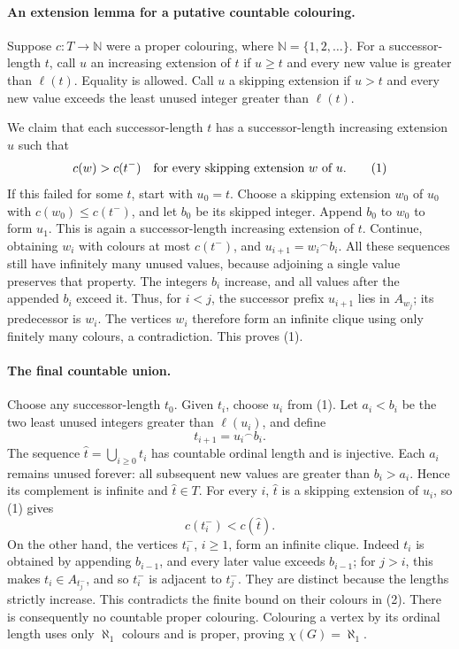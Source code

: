 \paragraph{An extension lemma for a putative countable colouring.}
Suppose \(c:T\to\mathbb N\) were a proper colouring, where \(\mathbb N=\{1,2,\ldots\}\).
For a successor-length \(t\), call \(u\) an increasing extension of \(t\) if \(u\geq t\) and every new value is greater than \(\ell(t)\). Equality is allowed. Call \(u\) a skipping extension if \(u>t\) and every new value exceeds the least unused integer greater than \(\ell(t)\).

We claim that each successor-length \(t\) has a successor-length increasing extension \(u\) such that
\[
 c(w)>c(t^-)
 \quad\hbox{for every skipping extension }w\hbox{ of }u.
 \tag{1}
\]
If this failed for some \(t\), start with \(u_0=t\). Choose a skipping extension \(w_0\) of \(u_0\) with \(c(w_0)\leq c(t^-)\), and let \(b_0\) be its skipped integer. Append \(b_0\) to \(w_0\) to form \(u_1\). This is again a successor-length increasing extension of \(t\). Continue, obtaining \(w_i\) with colours at most \(c(t^-)\), and \(u_{i+1}=w_i{}^\frown b_i\). All these sequences still have infinitely many unused values, because adjoining a single value preserves that property.
The integers \(b_i\) increase, and all values after the appended \(b_i\) exceed it. Thus, for \(i<j\), the successor prefix \(u_{i+1}\) lies in \(A_{w_j}\); its predecessor is \(w_i\). The vertices \(w_i\) therefore form an infinite clique using only finitely many colours, a contradiction. This proves (1).

\paragraph{The final countable union.}
Choose any successor-length \(t_0\). Given \(t_i\), choose \(u_i\) from (1). Let \(a_i<b_i\) be the two least unused integers greater than \(\ell(u_i)\), and define
\[
 t_{i+1}=u_i{}^\frown b_i.
\]
The sequence \(\widehat t=\bigcup_{i\geq0}t_i\) has countable ordinal length and is injective. Each \(a_i\) remains unused forever: all subsequent new values are greater than \(b_i>a_i\). Hence its complement is infinite and \(\widehat t\in T\). For every \(i\), \(\widehat t\) is a skipping extension of \(u_i\), so (1) gives
\[
 c(t_i^-)<c(\widehat t).
 \tag{2}
\]
On the other hand, the vertices \(t_i^-\), \(i\geq1\), form an infinite clique. Indeed \(t_i\) is obtained by appending \(b_{i-1}\), and every later value exceeds \(b_{i-1}\); for \(j>i\), this makes \(t_i\in A_{t_j^-}\), and so \(t_i^-\) is adjacent to \(t_j^-\). They are distinct because the lengths strictly increase. This contradicts the finite bound on their colours in (2).
There is consequently no countable proper colouring. Colouring a vertex by its ordinal length uses only \(\aleph_1\) colours and is proper, proving \(\chi(G)=\aleph_1\).

